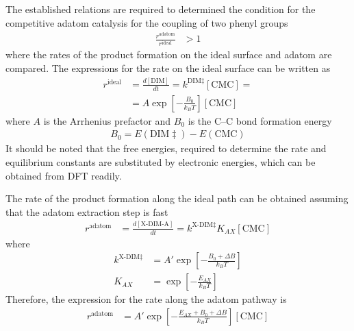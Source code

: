 \documentclass[aps,prl,reprint,amsmath,amssymb,floatfix,notitlepage]{revtex4-1}
\begin{document}
The established relations are required to determined the condition for the competitive adatom catalysis for the coupling of two phenyl groups 
%
\begin{equation} \label{eq:compete}
\begin{split}
\frac{r^{\text{adatom}} }{ r^{\text{ideal}} } &> 1
\end{split}
\end{equation}
%
where the rates of the product formation on the ideal surface and adatom are compared. The expressions for the rate on the ideal surface can be written as
%
\begin{equation}
\begin{split}
r^{\text{ideal}} &= \frac{d[\text{DIM}]}{dt} = k^{\text{DIM}\ddagger} [\text{CMC}]  = \\
&= A \exp\left[ -\frac{B_0}{k_B T} \right] [\text{CMC}] 
\end{split}
\end{equation}
%
where $A$ is the Arrhenius prefactor and $B_0$ is the C--C bond formation energy
%
\begin{equation}
\begin{split}
B_0 = E(\text{DIM}\ddagger) - E(\text{CMC}) 
\end{split}
\end{equation}
%
It should be noted that the free energies, required to determine the rate and equilibrium constants are substituted by electronic energies, which can be obtained from DFT readily.

The rate of the product formation along the ideal path can be obtained assuming that the adatom extraction step is fast
%
\begin{equation}
\begin{split}
r^{\text{adatom}} &= \frac{d[\text{X-DIM-A}]}{dt} = k^{\text{X-DIM}\ddagger} K_{AX} [\text{CMC}] 
\end{split}
\end{equation}
%
where
%
\begin{equation}
\begin{split}
k^{\text{X-DIM}\ddagger} &= A' \exp\left[ -\frac{B_0+\Delta B}{k_B T} \right] \\
K_{AX} &= \exp\left[ -\frac{E_{AX}}{k_B T} \right] 
\end{split}
\end{equation}
%
Therefore, the expression for the rate along the adatom pathway is 
%
\begin{equation}
\begin{split}
r^{\text{adatom}} &= A' \exp\left[ -\frac{E_{AX} +B_0+\Delta B}{k_B T} \right] [\text{CMC}] 
\end{split}
\end{equation}
%
\end{document}
